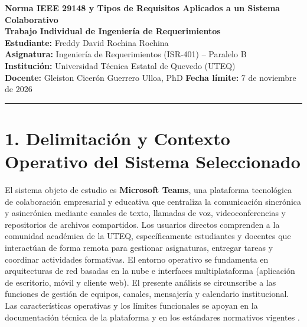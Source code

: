\documentclass[11pt,a4paper]{article}
\begin{document}
	
	\begin{center}
		{\Large \textbf{Norma IEEE 29148 y Tipos de Requisitos Aplicados a un Sistema Colaborativo}} \\[0.15cm]
		{\large \textbf{Trabajo Individual de Ingeniería de Requerimientos}} \\[0.25cm]
		\textbf{Estudiante:} Freddy David Rochina Rochina \\[0.05cm]
		\textbf{Asignatura:} Ingeniería de Requerimientos (ISR-401) -- Paralelo B \\[0.05cm]
		\textbf{Institución:} Universidad Técnica Estatal de Quevedo (UTEQ) \\[0.05cm]
		\textbf{Docente:} Gleiston Cicerón Guerrero Ulloa, PhD \quad \textbf{Fecha límite:} 7 de noviembre de 2026
	\end{center}
	\hrule
	\vspace{0.25cm}
	
	\section*{\textbf{1. Delimitación y Contexto Operativo del Sistema Seleccionado}}
	El sistema objeto de estudio es \textbf{Microsoft Teams}, una plataforma tecnológica de colaboración empresarial y educativa que centraliza la comunicación sincrónica y asincrónica mediante canales de texto, llamadas de voz, videoconferencias y repositorios de archivos compartidos. Los usuarios directos comprenden a la comunidad académica de la UTEQ, específicamente estudiantes y docentes que interactúan de forma remota para gestionar asignaturas, entregar tareas y coordinar actividades formativas. El entorno operativo se fundamenta en arquitecturas de red basadas en la nube e interfaces multiplataforma (aplicación de escritorio, móvil y cliente web). El presente análisis se circunscribe a las funciones de gestión de equipos, canales, mensajería y calendario institucional. Las características operativas y los límites funcionales se apoyan en la documentación técnica de la plataforma y en los estándares normativos vigentes \cite{iso29148_2018, iso25010_2023}.
	
\end{document}
